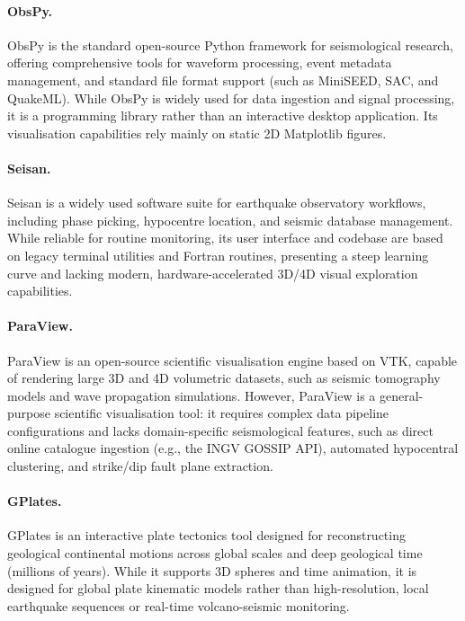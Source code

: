 \paragraph{ObsPy.}
ObsPy is the standard open-source Python framework for seismological research, offering comprehensive tools for waveform processing, event metadata management, and standard file format support (such as MiniSEED, SAC, and QuakeML). While ObsPy is widely used for data ingestion and signal processing, it is a programming library rather than an interactive desktop application. Its visualisation capabilities rely mainly on static 2D Matplotlib figures.

\paragraph{Seisan.}
Seisan is a widely used software suite for earthquake observatory workflows, including phase picking, hypocentre location, and seismic database management. While reliable for routine monitoring, its user interface and codebase are based on legacy terminal utilities and Fortran routines, presenting a steep learning curve and lacking modern, hardware-accelerated 3D/4D visual exploration capabilities.

\paragraph{ParaView.}
ParaView is an open-source scientific visualisation engine based on VTK, capable of rendering large 3D and 4D volumetric datasets, such as seismic tomography models and wave propagation simulations. However, ParaView is a general-purpose scientific visualisation tool: it requires complex data pipeline configurations and lacks domain-specific seismological features, such as direct online catalogue ingestion (e.g., the INGV GOSSIP API), automated hypocentral clustering, and strike/dip fault plane extraction.

\paragraph{GPlates.}
GPlates is an interactive plate tectonics tool designed for reconstructing geological continental motions across global scales and deep geological time (millions of years). While it supports 3D spheres and time animation, it is designed for global plate kinematic models rather than high-resolution, local earthquake sequences or real-time volcano-seismic monitoring.

